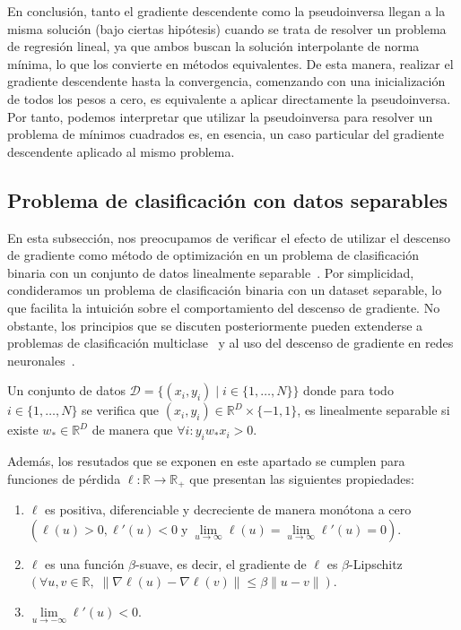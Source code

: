 En conclusión, tanto el gradiente descendente como la pseudoinversa llegan a la misma solución (bajo ciertas hipótesis) cuando se trata de resolver un problema de regresión lineal, ya que ambos buscan la solución interpolante de norma mínima, lo que los convierte en métodos equivalentes. De esta manera, realizar el gradiente descendente hasta la convergencia, comenzando con una inicialización de todos los pesos a cero, es equivalente a aplicar directamente la pseudoinversa. Por tanto, podemos interpretar que utilizar la pseudoinversa para resolver un problema de mínimos cuadrados es, en esencia, un caso particular del gradiente descendente aplicado al mismo problema.\newline

\subsection{Problema de clasificación con datos separables}\label{subsec:problema-clasificación-separable}
En esta subsección, nos preocupamos de verificar el efecto de utilizar el descenso de gradiente como método de optimización en un problema de clasificación binaria con un conjunto de datos linealmente separable~\cite{Soudry2024}. Por simplicidad, condideramos un problema de clasificación binaria con un dataset separable, lo que facilita la intuición sobre el comportamiento del descenso de gradiente. No obstante, los principios que se discuten posteriormente pueden extenderse a problemas de clasificación multiclase~\cite{Ravi2024} y al uso del descenso de gradiente en redes neuronales~\cite{Gunasekar2019}.\newline

\begin{definicion}
    Un conjunto de datos $\mathcal{D} = \{ (x_i, y_i) \; | \; i \in \{1, \ldots, N \}\}$ donde para todo $i \in \{1, \ldots, N \}$ se verifica que $(x_i, y_i) \in \mathbb{R}^{D} \times \{-1, 1\}$, es linealmente separable si existe $w_{*} \in \mathbb{R}^{D}$ de manera que $\forall i : y_i w_{*} x_i > 0$.\newline
\end{definicion}

Además, los resutados que se exponen en este apartado se cumplen para funciones de pérdida $\ell: \mathbb{R} \to \mathbb{R}_{+}$ que presentan las siguientes propiedades:
\begin{enumerate}
    \item\label{prop:positiva} $\ell$ es positiva, diferenciable y decreciente de manera monótona a cero $(\ell(u)>0, \ell'(u)<0 \; \text{y} \; \lim \limits_{u \to \infty} \ell(u) = \lim \limits_{u \to \infty} \ell'(u) = 0)$.
    \item\label{prop:smooth} $\ell$ es una función $\beta$-suave, es decir, el gradiente de $\ell$ es $\beta$-Lipschitz $(\forall u,v \in \mathbb{R}, \; \| \nabla \ell(u) - \nabla \ell(v) \| \leq \beta \| u-v \|)$.
    \item\label{prop:derivada_negativa} $\lim \limits_{u \to -\infty} \ell'(u) < 0$.\newline
\end{enumerate}

